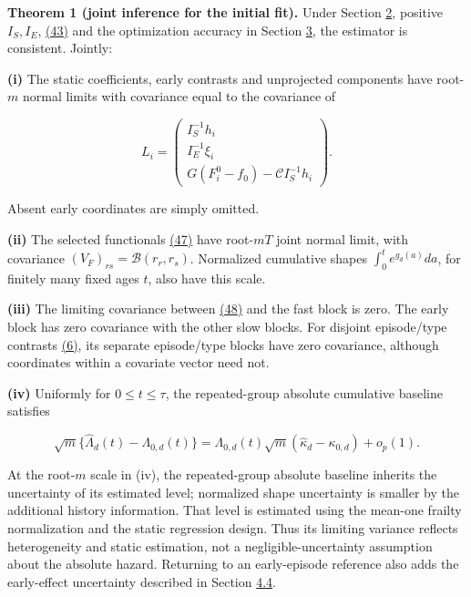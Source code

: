 \documentclass[11pt]{article}
\begin{document}
\label{res:Theorem-1}
\textbf{Theorem 1 (joint inference for the initial fit).} Under Section \hyperref[sec:2]{2}, positive \(I_S,I_E\), \hyperref[eq:43]{(43)} and the optimization accuracy in Section \hyperref[sec:3]{3}, the estimator is consistent. Jointly:

\textbf{(i)} The static coefficients, early contrasts and unprojected components have root-\(m\) normal limits with covariance equal to the covariance of

\begin{equation*}
L_i=
\begin{pmatrix}
 I_S^{-1}h_i\\
 I_E^{-1}\xi_i\\
 G(F_i^0-f_0)-\mathcal C I_S^{-1}h_i
\end{pmatrix}.
\tag{48}\label{eq:48}
\end{equation*}

Absent early coordinates are simply omitted.

\textbf{(ii)} The selected functionals \hyperref[eq:47]{(47)} have root-\(mT\) joint normal limit, with covariance
\((V_F)_{rs}=\mathcal B(r_r,r_s)\). Normalized cumulative shapes
\(\int_0^t e^{g_d(a)}da\), for finitely many fixed ages \(t\), also have this scale.

\textbf{(iii)} The limiting covariance between \hyperref[eq:48]{(48)} and the fast block is zero. The early block has zero covariance with the other slow blocks. For disjoint episode/type contrasts \hyperref[eq:6]{(6)}, its separate episode/type blocks have zero covariance, although coordinates within a covariate vector need not.

\textbf{(iv)} Uniformly for \(0\leq t\leq\tau\), the repeated-group absolute cumulative baseline satisfies

\begin{equation*}
\sqrt m\{\widehat\Lambda_d(t)-\Lambda_{0,d}(t)\}
=\Lambda_{0,d}(t)\sqrt m(\widehat\kappa_d-\kappa_{0,d})+o_p(1).
\tag{49}\label{eq:49}
\end{equation*}

At the root-\(m\) scale in (iv), the repeated-group absolute baseline inherits the uncertainty of its estimated level; normalized shape uncertainty is smaller by the additional history information. That level is estimated using the mean-one frailty normalization and the static regression design. Thus its limiting variance reflects heterogeneity and static estimation, not a negligible-uncertainty assumption about the absolute hazard. Returning to an early-episode reference also adds the early-effect uncertainty described in Section \hyperref[sec:4.4]{4.4}.
\end{document}
